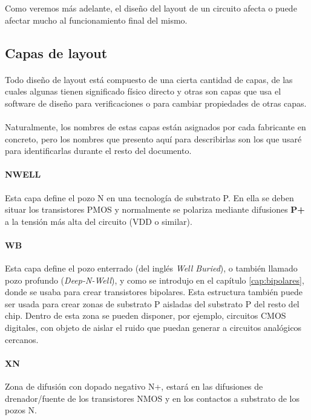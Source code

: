 Como veremos más adelante, el diseño del layout de un circuito afecta o puede afectar
mucho al funcionamiento final del mismo.

\subsection{Capas de layout}\label{cap:capas_layout}

\paragraph{}
Todo diseño de layout está compuesto de una cierta cantidad de capas, de las cuales
algunas tienen significado físico directo y otras son capas que usa el software de
diseño para verificaciones o para cambiar propiedades de otras capas.

\paragraph{}
Naturalmente, los nombres de estas capas están asignados por cada fabricante en
concreto, pero los nombres que presento aquí para describirlas son los que usaré
para identificarlas durante el resto del documento.

\paragraph{NWELL}
Esta capa define el pozo N en una tecnología de substrato P. En ella se deben
situar los transistores PMOS y normalmente se polariza mediante difusiones \textbf{P+}
a la tensión más alta del circuito (VDD o similar).

\paragraph{WB}
Esta capa define el pozo enterrado (del inglés \textit{Well Buried}), o también
llamado pozo profundo (\textit{Deep-N-Well}), y como se introdujo en el capítulo
\ref{cap:bipolares}, donde se usaba para crear transistores bipolares. Esta
estructura también puede ser usada para crear zonas de substrato P aisladas del substrato
P del resto del chip. Dentro de esta zona se pueden disponer, por ejemplo, circuitos
CMOS digitales, con objeto de aislar el ruido que puedan generar a circuitos analógicos
cercanos.

\paragraph{XN}
Zona de difusión con dopado negativo N+, estará en las difusiones de drenador/fuente
de los transistores NMOS y en los contactos a substrato de los pozos N.

